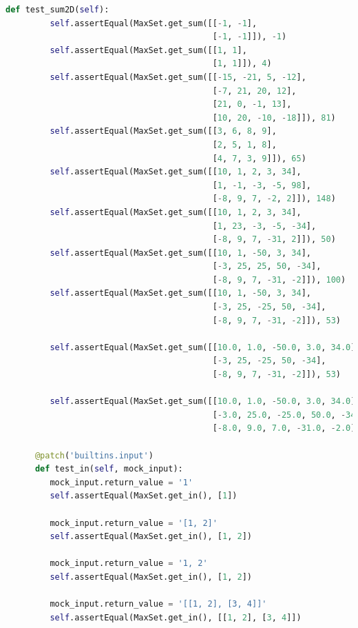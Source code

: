 \documentclass{article}
\begin{document}
\begin{lstlisting}[language = python]
      def test_sum2D(self):
         self.assertEqual(MaxSet.get_sum([[-1, -1],
                                          [-1, -1]]), -1)
         self.assertEqual(MaxSet.get_sum([[1, 1],
                                          [1, 1]]), 4)
         self.assertEqual(MaxSet.get_sum([[-15, -21, 5, -12],
                                          [-7, 21, 20, 12],
                                          [21, 0, -1, 13],
                                          [10, 20, -10, -18]]), 81)
         self.assertEqual(MaxSet.get_sum([[3, 6, 8, 9],
                                          [2, 5, 1, 8],
                                          [4, 7, 3, 9]]), 65)
         self.assertEqual(MaxSet.get_sum([[10, 1, 2, 3, 34],
                                          [1, -1, -3, -5, 98],
                                          [-8, 9, 7, -2, 2]]), 148)
         self.assertEqual(MaxSet.get_sum([[10, 1, 2, 3, 34],
                                          [1, 23, -3, -5, -34],
                                          [-8, 9, 7, -31, 2]]), 50)
         self.assertEqual(MaxSet.get_sum([[10, 1, -50, 3, 34],
                                          [-3, 25, 25, 50, -34],
                                          [-8, 9, 7, -31, -2]]), 100)
         self.assertEqual(MaxSet.get_sum([[10, 1, -50, 3, 34],
                                          [-3, 25, -25, 50, -34],
                                          [-8, 9, 7, -31, -2]]), 53)

         self.assertEqual(MaxSet.get_sum([[10.0, 1.0, -50.0, 3.0, 34.0],
                                          [-3, 25, -25, 50, -34],
                                          [-8, 9, 7, -31, -2]]), 53)

         self.assertEqual(MaxSet.get_sum([[10.0, 1.0, -50.0, 3.0, 34.0],
                                          [-3.0, 25.0, -25.0, 50.0, -34.0],
                                          [-8.0, 9.0, 7.0, -31.0, -2.0]]), 53)

      @patch('builtins.input')
      def test_in(self, mock_input):
         mock_input.return_value = '1'
         self.assertEqual(MaxSet.get_in(), [1])

         mock_input.return_value = '[1, 2]'
         self.assertEqual(MaxSet.get_in(), [1, 2])

         mock_input.return_value = '1, 2'
         self.assertEqual(MaxSet.get_in(), [1, 2])

         mock_input.return_value = '[[1, 2], [3, 4]]'
         self.assertEqual(MaxSet.get_in(), [[1, 2], [3, 4]])


\end{lstlisting}
\end{document}
